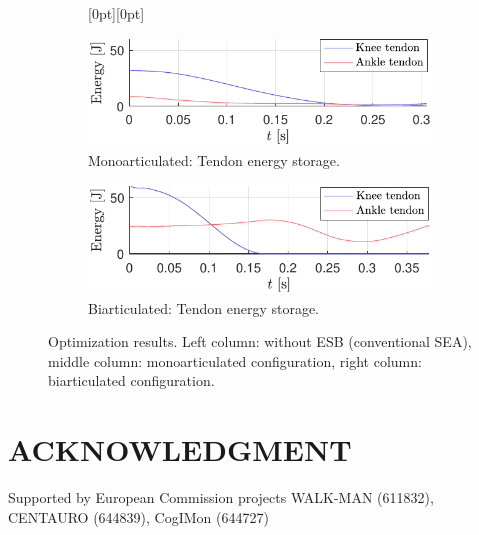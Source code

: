 \documentclass[letterpaper, 10 pt, conference]{ieeeconf}  %
\begin{document}
\begin{figure}[ht]
	\begin{subfigure}[t]{0.32\linewidth}
		\centering
		\raisebox{0pt}[0pt][0pt]{%
		}
	\end{subfigure}
	\begin{subfigure}[t]{0.32\linewidth}
		\includegraphics[width=\linewidth]{mono/ESB_storage}
		\caption{Monoarticulated: Tendon energy storage.}
		\label{fig:mono_ESB}
	\end{subfigure}
	\begin{subfigure}[t]{0.32\linewidth}
		\includegraphics[width=\linewidth]{bi/ESB_storage}
		\caption{Biarticulated: Tendon energy storage.}
		\label{fig:bi_ESB}
	\end{subfigure}
	
	\caption{Optimization results. Left column: without ESB (conventional SEA), middle column: monoarticulated configuration, right column: biarticulated configuration.}
	\label{fig:opt_results}
\end{figure}


\addtolength{\textheight}{-0cm}   %


\section{ACKNOWLEDGMENT}
Supported by European Commission projects WALK-MAN (611832), CENTAURO (644839), CogIMon (644727)



\end{document}
